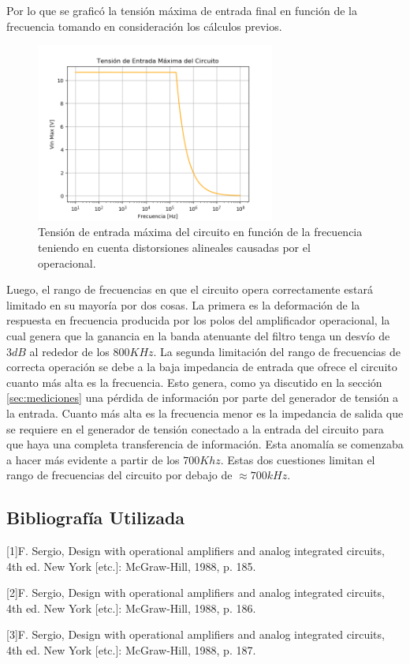 Por lo que se graficó la tensión máxima de entrada final en función de la frecuencia tomando en consideración los cálculos previos.

\begin{figure} [H]
	\centering
	\includegraphics[width=0.7\textwidth]{Imagenes/vin_max.PNG}
	\caption{Tensión de entrada máxima del circuito en función de la frecuencia teniendo en cuenta distorsiones alineales causadas por el operacional.}
	\label{fig:vin_max}
\end{figure}

Luego, el rango de frecuencias en que el circuito opera correctamente estará limitado en su mayoría por dos cosas. La primera es la deformación de la respuesta en frecuencia producida por los polos del amplificador operacional, la cual genera que la ganancia en la banda atenuante del filtro tenga un desvío de $3dB$ al rededor de los $800KHz$. La segunda limitación del rango de frecuencias de correcta operación se debe a la baja impedancia de entrada que ofrece el circuito cuanto más alta es la frecuencia. Esto genera, como ya discutido en la sección \ref{sec:mediciones} una pérdida de información por parte del generador de tensión a la entrada. Cuanto más alta es la frecuencia menor es la impedancia de salida que se requiere en el generador de tensión conectado a la entrada del circuito para que haya una completa transferencia de información. Esta anomalía se comenzaba a hacer más evidente a partir de los $700Khz$. Estas dos cuestiones limitan el rango de frecuencias del circuito por debajo de $\approx 700kHz$.


\subsection{Bibliografía Utilizada}
[1]F. Sergio, Design with operational amplifiers and analog integrated circuits, 4th ed. New York [etc.]: McGraw-Hill, 1988, p. 185.

[2]F. Sergio, Design with operational amplifiers and analog integrated circuits, 4th ed. New York [etc.]: McGraw-Hill, 1988, p. 186.

[3]F. Sergio, Design with operational amplifiers and analog integrated circuits, 4th ed. New York [etc.]: McGraw-Hill, 1988, p. 187.



